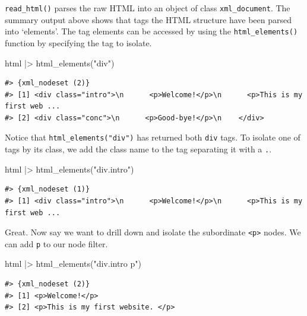 \documentclass[
  letterpaper,
]{scrbook}
\newenvironment{Shaded}{\begin{snugshade}}{\end{snugshade}}
\newcommand{\FunctionTok}[1]{\textcolor[rgb]{0.00,0.00,0.00}{#1}}
\newcommand{\NormalTok}[1]{\textcolor[rgb]{0.00,0.00,0.00}{#1}}
\newcommand{\SpecialCharTok}[1]{\textcolor[rgb]{0.00,0.00,0.00}{#1}}
\newcommand{\StringTok}[1]{\textcolor[rgb]{0.00,0.00,0.00}{#1}}
\begin{document}
\texttt{read\_html()} parses the raw HTML into an object of class
\texttt{xml\_document}. The summary output above shows that tags the
HTML structure have been parsed into `elements'. The tag elements can be
accessed by using the \texttt{html\_elements()} function by specifying
the tag to isolate.

\begin{Shaded}
\begin{Highlighting}[]
\NormalTok{html }\SpecialCharTok{|\textgreater{}} 
  \FunctionTok{html\_elements}\NormalTok{(}\StringTok{"div"}\NormalTok{)}
\end{Highlighting}
\end{Shaded}

\begin{verbatim}
#> {xml_nodeset (2)}
#> [1] <div class="intro">\n      <p>Welcome!</p>\n      <p>This is my first web ...
#> [2] <div class="conc">\n      <p>Good-bye!</p>\n    </div>
\end{verbatim}

Notice that \texttt{html\_elements("div")} has returned both
\texttt{div} tags. To isolate one of tags by its class, we add the class
name to the tag separating it with a \texttt{.}.

\begin{Shaded}
\begin{Highlighting}[]
\NormalTok{html }\SpecialCharTok{|\textgreater{}} 
  \FunctionTok{html\_elements}\NormalTok{(}\StringTok{"div.intro"}\NormalTok{)}
\end{Highlighting}
\end{Shaded}

\begin{verbatim}
#> {xml_nodeset (1)}
#> [1] <div class="intro">\n      <p>Welcome!</p>\n      <p>This is my first web ...
\end{verbatim}

Great. Now say we want to drill down and isolate the subordinate
\texttt{\textless{}p\textgreater{}} nodes. We can add \texttt{p} to our
node filter.

\begin{Shaded}
\begin{Highlighting}[]
\NormalTok{html }\SpecialCharTok{|\textgreater{}} 
  \FunctionTok{html\_elements}\NormalTok{(}\StringTok{"div.intro p"}\NormalTok{)}
\end{Highlighting}
\end{Shaded}

\begin{verbatim}
#> {xml_nodeset (2)}
#> [1] <p>Welcome!</p>
#> [2] <p>This is my first website. </p>
\end{verbatim}
\end{document}
